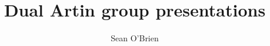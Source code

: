 \documentclass{amsart}
\begin{document}
\title{Dual Artin group presentations}


\author{Sean O'Brien}
\address{}
\curraddr{}


%

\maketitle




% 




\end{document}
